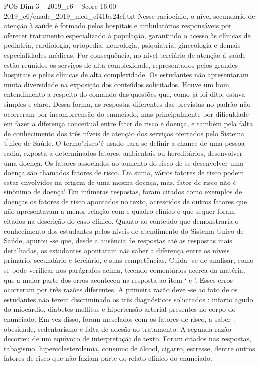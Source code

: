 \begin{textsample}{POS Dim 3 – 2019\_c6 – Score 16.00 – 2019\_c6/enade\_2019\_med\_cf41be24ef.txt}
Nesse raciocínio, o nível secundário de atenção à saúde é formado pelos hospitais e ambulatórios responsáveis por oferecer tratamento especializado à população, garantindo o acesso às clínicas de pediatria, cardiologia, ortopedia, neurologia, psiquiatria, ginecologia e demais especialidades médicas.
Por consequência, no nível terciário de atenção à saúde estão reunidos os serviços de alta complexidade, representados pelos grandes hospitais e pelas clínicas de alta complexidade.
Os estudantes não apresentaram muita diversidade na exposição dos conteúdos solicitados.
Houve um bom entendimento a respeito do comando das questões que, como já foi dito, estava simples e claro.
Dessa forma, as respostas diferentes das previstas no padrão não ocorreram por incompreensão do enunciado, mas principalmente por dificuldade em fazer a diferença conceitual entre fator de risco e doença, e também pela falta de conhecimento dos três níveis de atenção dos serviços ofertados pelo Sistema Único de Saúde.
O termo"risco"é usado para se definir a chance de uma pessoa sadia, exposta a determinados fatores, ambientais ou hereditários, desenvolver uma doença.
Os fatores associados ao aumento do risco de se desenvolver uma doença são chamados fatores de risco.
Em suma, vários fatores de risco podem estar envolvidos na origem de uma mesma doença, mas, fator de risco não é sinônimo de doença!
Em inúmeras respostas, foram citados como exemplos de doenças os fatores de risco apontados no texto, acrescidos de outros fatores que não apresentavam a menor relação com o quadro clínico e que sequer foram citados na descrição do caso clínico.
Quanto ao conteúdo que demonstraria o conhecimento dos estudantes pelos níveis de atendimento do Sistema Único de Saúde, apurou -se que, desde a ausência de respostas até as respostas mais detalhadas, os estudantes apontaram não saber a diferença entre os níveis primário, secundário e terciário, e suas competências.
Cuida -se de analisar, como se pode verificar nos parágrafos acima, tecendo comentários acerca da matéria, que a maior parte dos erros aconteceu na resposta ao item ‘ c ’.
Esses erros ocorreram por três razões diferentes.
A primeira razão deve -se ao fato de os estudantes não terem discriminado os três diagnósticos solicitados : infarto agudo do miocárdio, diabetes mellitus e hipertensão arterial presentes no corpo do enunciado.
Em vez disso, foram mesclados com os fatores de risco, a saber : obesidade, sedentarismo e falta de adesão ao tratamento.
A segunda razão decorreu de um equívoco de interpretação de texto.
Foram citados nas respostas, tabagismo, hipercolesterolemia, consumo de álcool, cigarro, estresse, dentre outros fatores de risco que não faziam parte do relato clínico do enunciado.

\end{textsample}
